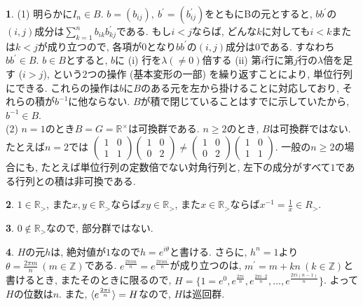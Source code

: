 \documentclass{amsart}
\theoremstyle{definition}
\newtheorem{ans}{}
\numberwithin{ans}{subsection}
\DeclarePairedDelimiter{\gen}{\langle}{\rangle}
\begin{document}
\begin{ans}
  (1) 明らかに$I_n \in B$.
  $b = (b_{ij}),\ b^\prime = (b^\prime_{ij})$をともにBの元とすると,
  $bb^\prime$の$(i, j)$成分は$\sum_{k = 1}^nb_{ik}b^\prime_{kj}$である.
  もし$i < j$ならば, どんな$k$に対しても$i < k$または$k < j$が成り立つので,
  各項が$0$となり$bb^\prime$の$(i, j)$成分は$0$である. すなわち$bb^\prime \in B$.
  $b \in B$とすると, $b$に
  (i) 行を$\lambda (\neq 0)$倍する
  (ii) 第$i$行に第$j$行の$\lambda$倍を足す ($i > j$),
  という$2$つの操作 (基本変形の一部) を繰り返すことにより, 単位行列にできる.
  これらの操作は$b$に$B$のある元を左から掛けることに対応しており, それらの積が$b^{-1}$に他ならない.
  $B$が積で閉じていることはすでに示していたから, $b^{-1} \in B$.\\
  (2) $n = 1$のとき$B = G = \mathbb{R}^\times$は可換群である.
  $n \ge 2$のとき, $B$は可換群ではない. たとえば$n = 2$では
  $\begin{pmatrix}
    1 & 0 \\
    1 & 1
  \end{pmatrix}\begin{pmatrix}
    1 & 0 \\
    0 & 2
  \end{pmatrix} \neq \begin{pmatrix}
    1 & 0 \\
    0 & 2
  \end{pmatrix}\begin{pmatrix}
    1 & 0 \\
    1 & 1
  \end{pmatrix}$.
  一般の$n \ge 2$の場合にも, たとえば単位行列の定数倍でない対角行列と,
  左下の成分がすべて$1$である行列との積は非可換である.
\end{ans}

\begin{ans}
  $1 \in \mathbb{R}_>$,
  また$x, y \in \mathbb{R}_>$ならば$xy \in \mathbb{R}_>$,
  また$x \in \mathbb{R}_>$ならば$x^{-1} = \frac{1}{x} \in {R}_>$.
\end{ans}

\begin{ans}
  $0 \notin \mathbb{R}_>$なので, 部分群ではない.
\end{ans}

\begin{ans}
  $H$の元$h$は, 絶対値が$1$なので$h = e^{i\theta}$と書ける.
  さらに, $h^n = 1$より$\theta = \frac{2\pi m}{n}\ (m \in \mathbb{Z})$である.
  $e^\frac{2\pi im}{n} = e^\frac{2\pi i m^\prime}{n}$が成り立つのは,
  $m^\prime = m + kn\ (k \in \mathbb{Z})$と書けるとき, またそのときに限るので,
  $H = \{1 = e^0, e^\frac{2\pi i}{n}, e^\frac{2\pi i \cdot 2}{n},..., e^\frac{2\pi i(n - 1)}{n}\}$.
  よって$H$の位数は$n$.
  また, $\gen{e^\frac{2\pi i}{n}} = H$なので, $H$は巡回群.
\end{ans}
\end{document}
